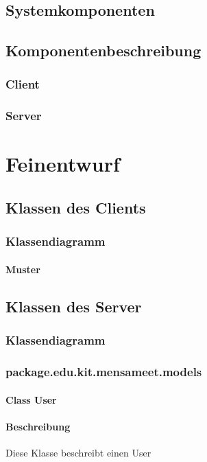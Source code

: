 \documentclass[a4paper]{scrreprt}
\begin{document}
\section{Systemkomponenten}
\section{Komponentenbeschreibung}
\subsection{Client}
\subsection{Server}


\chapter{Feinentwurf}
\section{Klassen des Clients}
\subsection{Klassendiagramm}

\subsubsection{Muster}

\section{Klassen des Server}
\subsection{Klassendiagramm}
\subsection{package.edu.kit.mensameet.models}
\subsubsection{Class User}
\subsubsection*{Beschreibung}
Diese Klasse beschreibt einen User 
\end{document}
